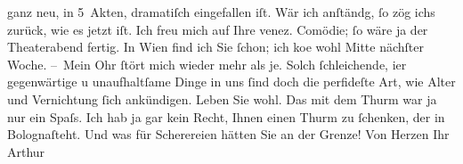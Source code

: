 \begin{ledgroupsized}[t]{13cm}
                    ganz neu, in 5 {\pb}Akten, dramatiſch eingefallen iſt.
                    Wär ich anſtändg, ſo zög ichs zurück, wie es jetzt iſt.\pend
           \pstart
           Ich freu mich auf Ihre venez.
                        Comödie; ſo wäre ja der Theaterabend fertig. In Wien find ich Sie ſchon; ich ko{\geminationm}e wohl Mitte nächſter Woche.\pend
           \pstart
           – Mein Ohr ſtört mich wieder mehr als je. Solch ſchleichende, {\pb}i{\geminationm}er gegenwärtige u unaufhaltſame Dinge in uns ſind
                    doch die perfideſte Art, wie Alter und Vernichtung ſich ankündigen.\pend
           \pstart
           Leben Sie wohl. Das mit dem Thurm war ja nur
                    ein Spaſs. Ich hab ja gar kein Recht, Ihnen einen Thurm zu ſchenken, der in Bolognaſteht. Und was für Scherereien hätten Sie an
                    der Grenze!\pend
           \pstart Von Herzen Ihr \spacefill\mbox{Arthur}\pend{}\endnumbering{}\end{ledgroupsized}  \newcommand{\dateiname}{L00850}\newcommand{\titel}{Arthur Schnitzler an Hugo von Hofmannsthal, 4. 10. 1898}\newcommand{\editorInnen}{Martin Anton Müller und Gerd-Hermann Susen}
      
